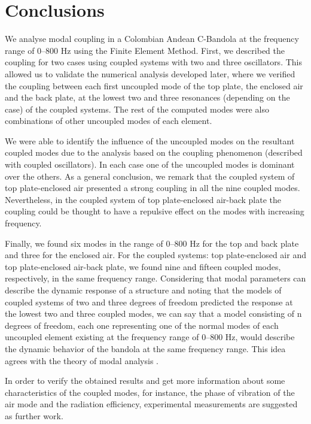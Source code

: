 \section{Conclusions}

We analyse modal coupling in a Colombian Andean C-Bandola at the frequency range of {0--800 Hz} using the Finite Element Method. First, we described the coupling for two cases using coupled systems with two and three oscillators. This allowed us to validate the numerical analysis developed later, where we verified the coupling between each first uncoupled mode of the top plate, the enclosed air and the back plate, at the lowest two and three resonances (depending on the case) of the coupled systems. The rest of the computed modes were also combinations of other uncoupled modes of each element.

We were able to identify the influence of the uncoupled modes on the resultant coupled modes due to the analysis based on the coupling phenomenon (described with coupled oscillators). In each case one of the uncoupled modes is dominant over the others. As a general conclusion, we remark that the coupled system of top plate-enclosed air presented a strong coupling in all the nine coupled modes. Nevertheless, in the coupled system of top plate-enclosed air-back plate the coupling could be thought to have a repulsive effect on the modes with increasing frequency.

Finally, we found six modes in the range of {0--800 Hz} for the top and back plate and three for the enclosed air. For the coupled systems: top plate-enclosed air and top plate-enclosed air-back plate, we found nine and fifteen coupled modes, respectively, in the same frequency range. Considering that modal parameters can describe the dynamic response of a structure and noting that the models of coupled systems of two and three degrees of freedom predicted the response at the lowest two and three coupled modes, we can say that a model consisting of n degrees of freedom, each one representing one of the normal modes of each uncoupled element existing at the frequency range of {0--800 Hz}, would describe the dynamic behavior of the bandola at the same frequency range. This idea agrees with the theory of modal analysis \cite{Ewins}.

In order to verify the obtained results and get more information about some characteristics of the coupled modes, for instance, the phase of vibration of the air mode and the radiation efficiency, experimental measurements are suggested as further work.
